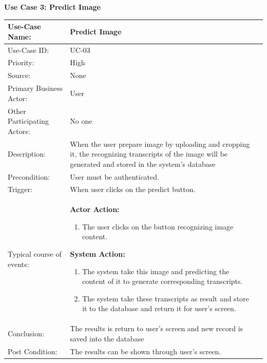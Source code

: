 \noindent
\textbf{Use Case 3: Predict Image}
\begin{table}[H]
    \centering
    \begin{tabular}{|l|p{}|p{}|}
    	\hline
    	Use-Case Name: & Predict Image\\ \hline
    	Use-Case ID:& UC-03 \\\hline
    	Priority:& High\\ \hline
    	Source:& None \\ \hline
    	Primary Business Actor: & User \\ \hline
    	Other Participating Actors:&  No one\\ \hline
    	Description:&  When the user prepare image by uploading and cropping it, the recognizing transcripts of the image will be generated and stored in the system's database  \\ \hline
    	Precondition:&  User must be authenticated. \\ \hline
    	Trigger:&  When user clicks on the predict button. \\ \hline 
    	Typical course of events:&  \textbf{Actor Action:}
    	\begin{enumerate}
    		\item 	The user clicks on the button recognizing image content.
    	\end{enumerate}
    
    	\vspace{2mm}
    	
    	\textbf{System Action: }
    	\begin{enumerate}
    		\item The system take this image and predicting the content of it to generate corresponding transcripts.
    		\item The system take these transcripts as result and store it to the database and return it for user's screen.
    	\end{enumerate}
    	\\ \hline
    	Conclusion:  & The results is return to user's screen and new record is saved into the database \\ \hline
    	Post Condition: & The results can be shown through user's screen. \\ \hline
    \end{tabular}\\
\end{table}

\pagebreak

